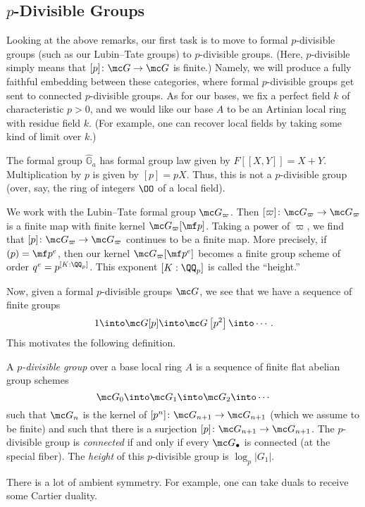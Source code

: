 \documentclass[../notes.tex]{subfiles}
\begin{document}
\subsection{\texorpdfstring{$p$}{p}-Divisible Groups}
Looking at the above remarks, our first task is to move to formal $p$-divisible groups (such as our Lubin--Tate groups) to $p$-divisible groups. (Here, $p$-divisible simply means that $[p]\colon\mc G\to\mc G$ is finite.) Namely, we will produce a fully faithful embedding between these categories, where formal $p$-divisible groups get sent to connected $p$-divisible groups. As for our bases, we fix a perfect field $k$ of characteristic $p>0$, and we would like our base $A$ to be an Artinian local ring with residue field $k$. (For example, one can recover local fields by taking some kind of limit over $k$.)
\begin{nex}
	The formal group $\widehat{\mathbb G}_a$ has formal group law given by $F[[X,Y]]=X+Y$. Multiplication by $p$ is given by $[p]=pX$. Thus, this is not a $p$-divisible group (over, say, the ring of integers $\OO$ of a local field).
\end{nex}
\begin{example}
	We work with the Lubin--Tate formal group $\mc G_\varpi$. Then $[\varpi]\colon\mc G_\varpi\to\mc G_\varpi$ is a finite map with finite kernel $\mc G_\varpi[\mf p]$. Taking a power of $\varpi$, we find that $[p]\colon\mc G_\varpi\to\mc G_\varpi$ continues to be a finite map. More precisely, if $(p)=\mf p^e$, then our kernel $\mc G_\varpi[\mf p^e]$ becomes a finite group scheme of order $q^e=p^{[K:\QQ_p]}$. This exponent $[K:\QQ_p]$ is called the ``height.''
\end{example}
Now, given a formal $p$-divisible groups $\mc G$, we see that we have a sequence of finite groups
\[1\into\mc G[p]\into\mc G\left[p^2\right]\into\cdots.\]
This motivates the following definition.
\begin{definition}
	A \textit{$p$-divisible group} over a base local ring $A$ is a sequence of finite flat abelian group schemes
	\[\mc G_0\into\mc G_1\into\mc G_2\into\cdots\]
	such that $\mc G_n$ is the kernel of $[p^n]\colon\mc G_{n+1}\to\mc G_{n+1}$ (which we assume to be finite) and such that there is a surjection $[p]\colon\mc G_{n+1}\to\mc G_{n+1}$. The $p$-divisible group is \textit{connected} if and only if every $\mc G_\bullet$ is connected (at the special fiber). The \textit{height} of this $p$-divisible group is $\log_p\left|G_1\right|$.
\end{definition}
\begin{remark}
	There is a lot of ambient symmetry. For example, one can take duals to receive some Cartier duality.
\end{remark}
\end{document}
